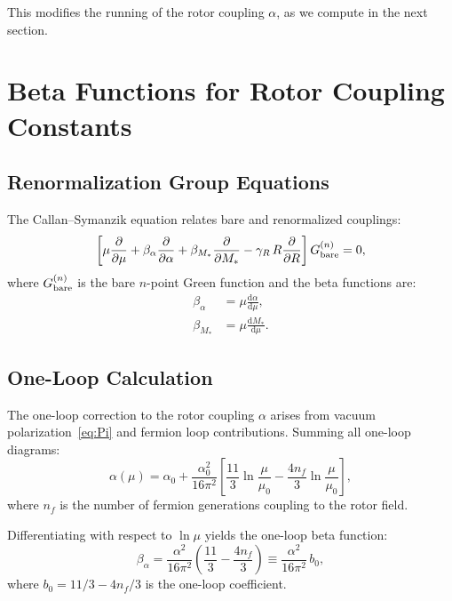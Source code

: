 \documentclass[11pt,a4paper]{article}
\numberwithin{equation}{section}
\theoremstyle{plain}
\theoremstyle{definition}
\theoremstyle{remark}
\newcommand{\dd}{\mathrm{d}}
\begin{document}
This modifies the running of the rotor coupling $\alpha$, as we compute in the next section.

\vspace{1em}

\section{Beta Functions for Rotor Coupling Constants}\label{sec:beta}

\subsection{Renormalization Group Equations}

The Callan--Symanzik equation relates bare and renormalized couplings:
\begin{equation}
\left[\mu\frac{\partial}{\partial\mu} + \beta_\alpha\frac{\partial}{\partial\alpha} + \beta_{M_*}\frac{\partial}{\partial M_*} - \gamma_R\,R\frac{\partial}{\partial R}\right]G_{\rm bare}^{(n)} = 0,
\label{eq:CS-eqn}
\end{equation}
where $G_{\rm bare}^{(n)}$ is the bare $n$-point Green function and the beta functions are:
\begin{align}
\beta_\alpha &= \mu\frac{\dd\alpha}{\dd\mu}, \label{eq:beta-alpha-def}\\
\beta_{M_*} &= \mu\frac{\dd M_*}{\dd\mu}. \label{eq:beta-M-def}
\end{align}

\subsection{One-Loop Calculation}

The one-loop correction to the rotor coupling $\alpha$ arises from vacuum polarization~\eqref{eq:Pi} and fermion loop contributions. Summing all one-loop diagrams:
\begin{equation}
\alpha(\mu) = \alpha_0 + \frac{\alpha_0^2}{16\pi^2}\left[\frac{11}{3}\ln\frac{\mu}{\mu_0} - \frac{4n_f}{3}\ln\frac{\mu}{\mu_0}\right],
\label{eq:alpha-1loop}
\end{equation}
where $n_f$ is the number of fermion generations coupling to the rotor field.

Differentiating with respect to $\ln\mu$ yields the one-loop beta function:
\begin{equation}
\beta_\alpha = \frac{\alpha^2}{16\pi^2}\left(\frac{11}{3} - \frac{4n_f}{3}\right) \equiv \frac{\alpha^2}{16\pi^2}\,b_0,
\label{eq:beta-alpha-1loop-final}
\end{equation}
where $b_0 = 11/3 - 4n_f/3$ is the one-loop coefficient.
\end{document}
